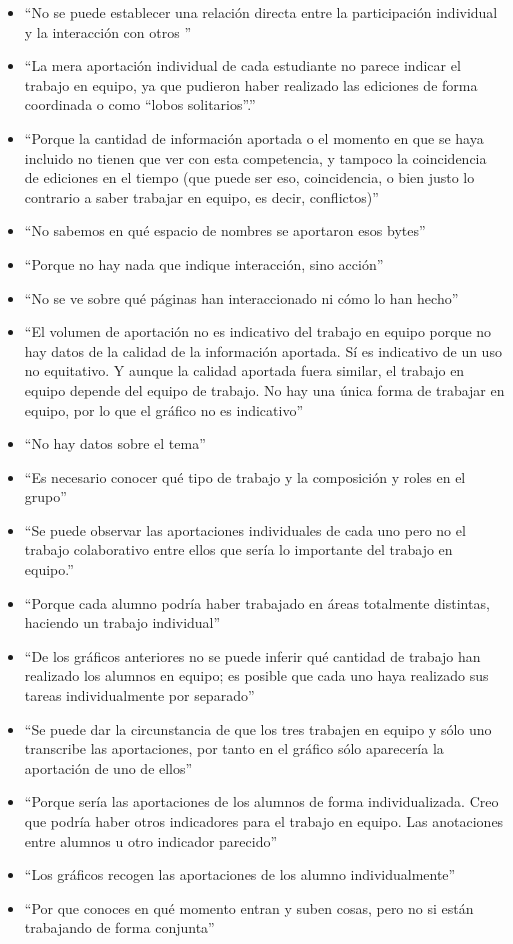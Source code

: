 \begin{itemize}
\item ``No se puede establecer una relación directa entre la participación individual y la interacción con otros	''
\item ``La mera aportación individual de cada estudiante no parece indicar el trabajo en equipo, ya que pudieron haber realizado las ediciones de forma coordinada o como ``lobos solitarios''.''
\item ``Porque la cantidad de información aportada o el momento en que se haya incluido no tienen que ver con esta competencia, y tampoco la coincidencia de ediciones en el tiempo (que puede ser eso, coincidencia, o bien justo lo contrario a saber trabajar en equipo, es decir, conflictos)''
\item ``No sabemos en qué espacio de nombres se aportaron esos bytes''
\item ``Porque no hay nada que indique interacción, sino acción''
\item ``No se ve sobre qué páginas han interaccionado ni cómo lo han hecho''
\item ``El volumen de aportación no es indicativo del trabajo en equipo porque no hay datos de la calidad de la información aportada. Sí es indicativo de un uso no equitativo. Y aunque la calidad aportada fuera similar, el trabajo en equipo depende del equipo de trabajo. No hay una única forma de trabajar en equipo, por lo que el gráfico no es indicativo''
\item ``No hay datos sobre el tema''
\item ``Es necesario conocer qué tipo de trabajo y la composición y roles en el grupo''
\item ``Se puede observar las aportaciones individuales de cada uno pero no el trabajo colaborativo entre ellos que sería lo importante del trabajo en equipo.''
\item ``Porque cada alumno podría haber trabajado en áreas totalmente distintas, haciendo un trabajo individual''
\item ``De los gráficos anteriores no se puede inferir qué cantidad de trabajo han realizado los alumnos en equipo; es posible que cada uno haya realizado sus tareas individualmente por separado''
\item ``Se puede dar la circunstancia de que los tres trabajen en equipo y sólo uno transcribe las aportaciones, por tanto en el gráfico sólo aparecería la aportación de uno de ellos''
\item ``Porque sería las aportaciones de los alumnos de forma individualizada. Creo que podría haber otros indicadores para el trabajo en equipo. Las anotaciones entre alumnos u otro indicador parecido''
\item ``Los gráficos recogen las aportaciones de los alumno individualmente''
\item ``Por que conoces en qué momento entran y suben cosas, pero no si están trabajando de forma conjunta''
\end{itemize}

